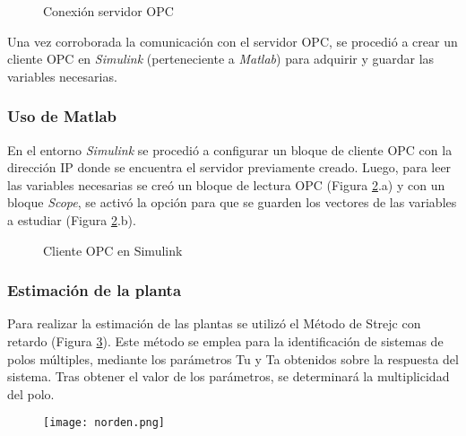 {\begin{figure}[htbp]
	\centering
	\caption{Conexión servidor OPC} \label{fig:opc2}
\end{figure}

Una vez corroborada la comunicación con el servidor OPC, se procedió a crear un cliente OPC en \textit{Simulink} (perteneciente a \textit{Matlab}) para adquirir y guardar las variables necesarias. 


\subsubsection{Uso de Matlab}
En el entorno \textit{Simulink} se procedió a configurar un bloque de cliente OPC con la dirección IP donde se encuentra el servidor previamente creado. Luego, para leer las variables necesarias se creó un bloque de lectura OPC (Figura \ref{fig:opcsimu}.a) y con un bloque \textit{Scope}, se activó la opción para que se guarden los vectores de las variables a estudiar (Figura \ref{fig:opcsimu}.b). 


\begin{figure}[htbp]
	\centering
	\caption{Cliente OPC en Simulink} \label{fig:opcsimu}
\end{figure}



\subsubsection{Estimación de la planta}
Para realizar la estimación de las plantas se utilizó el Método de Strejc con retardo (Figura \ref{fig:norden})\cite{pomares2011sistemas}.
Este método se emplea para la identificación de sistemas de polos múltiples,
mediante los parámetros Tu y Ta obtenidos sobre la respuesta del sistema.
Tras obtener el valor de los parámetros, se determinará la multiplicidad del polo. 
\begin{figure}[htb]
	\centering
	\texttt{[image: norden.png]}
	\label{fig:norden}
\end{figure}

}
